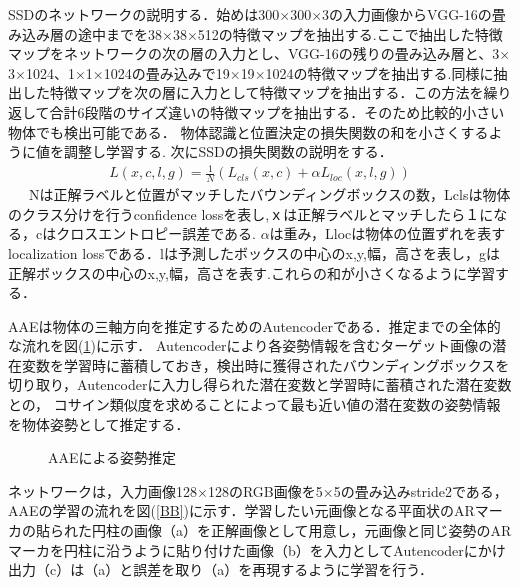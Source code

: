 \documentclass{jsarticle}
\begin{document}
SSDのネットワークの説明する．始めは300$\times$300$\times$3の入力画像からVGG-16の畳み込み層の途中までを38$\times$38$\times$512の特徴マップを抽出する.ここで抽出した特徴マップをネットワークの次の層の入力とし、VGG-16の残りの畳み込み層と、3$\times$3$\times$1024、1$\times$1$\times$1024の畳み込みで19$\times$19$\times$1024の特徴マップを抽出する.同様に抽出した特徴マップを次の層に入力として特徴マップを抽出する．この方法を繰り返して合計6段階のサイズ違いの特徴マップを抽出する．そのため比較的小さい物体でも検出可能である．
物体認識と位置決定の損失関数の和を小さくするように値を調整し学習する.
次にSSDの損失関数の説明をする．
\begin{eqnarray}
\label{sonsitu}
L(x, c, l, g)=\frac{1}{N}\left(L_{cls}(x, c)+\alpha L_{loc}(x, l, g)\right)
\end{eqnarray}
\ \ \ Nは正解ラベルと位置がマッチしたバウンディングボックスの数，Lclsは物体のクラス分けを行うconﬁdence lossを表し,ｘは正解ラベルとマッチしたら１になる，cはクロスエントロピー誤差である.
$\alpha$は重み，Llocは物体の位置ずれを表すlocalization lossである．lは予測したボックスの中心のx,y,幅，高さを表し，gは正解ボックスの中心のx,y,幅，高さを表す.これらの和が小さくなるように学習する．




AAEは物体の三軸方向を推定するためのAutencoderである．推定までの全体的な流れを図(\ref{GG})に示す．
Autencoderにより各姿勢情報を含むターゲット画像の潜在変数を学習時に蓄積しておき，検出時に獲得されたバウンディングボックスを切り取り，Autencoderに入力し得られた潜在変数と学習時に蓄積された潜在変数との，
コサイン類似度を求めることによって最も近い値の潜在変数の姿勢情報を物体姿勢として推定する．

\begin{figure}[ht]
\vspace{-5zh}
\setlength{\epsfxsize}{7.5cm}
\centerline{}
\vspace{3zh}
\caption{AAEによる姿勢推定}
\label{GG}
\vspace{-1.0zh}
\end{figure}
ネットワークは，入力画像128$\times$128のRGB画像を5$\times$5の畳み込みstride2である，
AAEの学習の流れを図(\ref{BB})に示す．学習したい元画像となる平面状のARマーカの貼られた円柱の画像（a）を正解画像として用意し，元画像と同じ姿勢のARマーカを円柱に沿うように貼り付けた画像（b）を入力としてAutencoderにかけ出力（c）は（a）と誤差を取り（a）を再現するように学習を行う．
\end{document}
